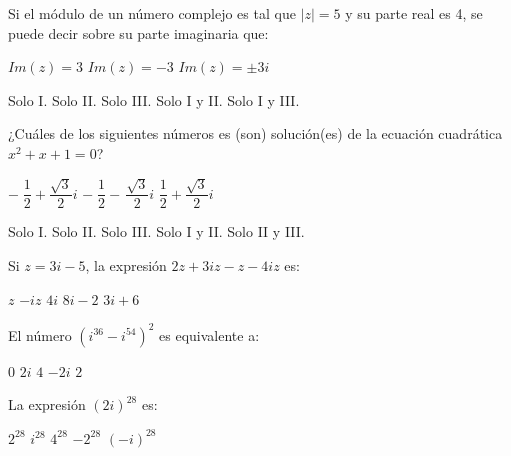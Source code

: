 \documentclass[]{srs}
\begin{document}
\begin{preguntas}[after-item-skip=2cm]
\pregunta Si el módulo de un número complejo es tal que $|z|=5$ y su parte real es 4,
se puede decir sobre su parte imaginaria que:\\
\begin{vertical*}
  \alternativa $Im(z)=3$
  \alternativa $Im(z)=-3$
  \alternativa $Im(z)=\pm 3i$
\end{vertical*}
\begin{vertical}
  \alternativa Solo I.
  \alternativa Solo II.
  \alternativa Solo III.
  \alternativa Solo I y II.
  \alternativa Solo I y III.
\end{vertical}

\pregunta ¿Cuáles de los siguientes números es (son) solución(es) de la ecuación
cuadrática $x^2+x+1=0$?\\
\begin{vertical*}
  \alternativa $-\;\dfrac{1}{2}+\dfrac{\sqrt{3}}{2}i$
  \alternativa $-\;\dfrac{1}{2}-\,\dfrac{\sqrt{3}}{2}i$
  \alternativa $\dfrac{1}{2}+\dfrac{\sqrt{3}}{2}i$
\end{vertical*}
\begin{vertical}
  \alternativa Solo I.
  \alternativa Solo II.
  \alternativa Solo III.
  \alternativa Solo I y II.
  \alternativa Solo II y III.
\end{vertical}

\pregunta Si $z=3i-5$, la expresión $2z+3iz-z-4iz$ es:\\
\begin{vertical}
  \alternativa $z$
  \alternativa $-iz$
  \alternativa $4i$
  \alternativa $8i-2$
  \alternativa $3i+6$
\end{vertical}

\pregunta El número $(i^{36}-i^{54})^2$ es equivalente a:\\
\begin{vertical}
  \alternativa $0$
  \alternativa $2i$
  \alternativa $4$
  \alternativa $-2i$
  \alternativa $2$
\end{vertical}

\pregunta La expresión $(2i)^{28}$ es:\\
\begin{vertical}
  \alternativa $2^{28}$
  \alternativa $i^{28}$
  \alternativa $4^{28}$
  \alternativa $-2^{28}$
  \alternativa $(-i)^{28}$
\end{vertical}

\end{preguntas}
\end{document}
